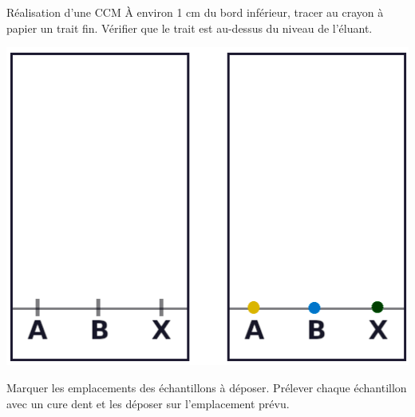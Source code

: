 \begin{doc}{Réalisation d'une CCM}
{    \vspace*{-12pt}
    À environ 1 cm du bord inférieur, tracer au crayon à papier un trait fin.
    Vérifier que le trait est au-dessus du niveau de l'éluant.
  }{
    \begin{center}
      \includegraphics[height=0.15\textheight]{images/CCM/CCM_etapes_depot.png}
    \end{center}
    
    \vspace*{-12pt}
    Marquer les emplacements des échantillons à déposer.
    Prélever chaque échantillon avec un cure dent et les déposer sur l'emplacement prévu.
  }
  
  \bigskip
  
\end{doc}
